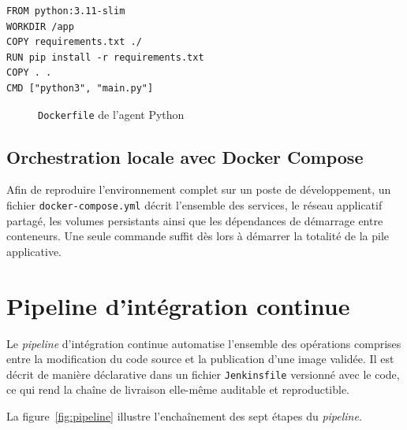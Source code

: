 \begin{lrbox}{\codebox}
\begin{minipage}{0.88\textwidth}
\begin{verbatim}
FROM python:3.11-slim
WORKDIR /app
COPY requirements.txt ./
RUN pip install -r requirements.txt
COPY . .
CMD ["python3", "main.py"]
\end{verbatim}
\end{minipage}
\end{lrbox}
\begin{figure}[H]
\centering
\fbox{\usebox{\codebox}}
\caption{\texttt{Dockerfile} de l'agent Python}
\label{fig:dockerfile-agent}
\end{figure}

\subsection{Orchestration locale avec Docker Compose}
Afin de reproduire l'environnement complet sur un poste de développement, un fichier
\texttt{docker-compose.yml} décrit l'ensemble des services, le réseau applicatif partagé,
les volumes persistants ainsi que les dépendances de démarrage entre conteneurs. Une
seule commande suffit dès lors à démarrer la totalité de la pile applicative.

\section{Pipeline d'intégration continue}
Le \textit{pipeline} d'intégration continue automatise l'ensemble des opérations
comprises entre la modification du code source et la publication d'une image validée. Il
est décrit de manière déclarative dans un fichier \texttt{Jenkinsfile} versionné avec le
code, ce qui rend la chaîne de livraison elle-même auditable et reproductible.

La figure~\ref{fig:pipeline} illustre l'enchaînement des sept étapes du \textit{pipeline}.

